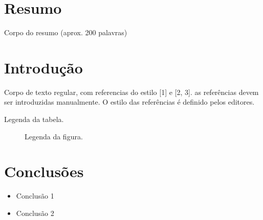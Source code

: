 \documentclass[11pt,twoside]{article}
\begin{document}
{\setlength{\parindent}{30pt}%

\small%
\section*{Resumo}
\smallskip
Corpo do resumo (aprox. 200 palavras)

\vspace{15pt}





\section{Introdução}
Corpo de texto regular, com referencias do estilo [1] e [2, 3]. as referências devem ser introduzidas manualmente. O estilo das referências é definido pelos editores.



\begin{table}[!h]
\caption{Legenda da tabela.}

\end{table}



\begin{figure}[!h]
\centering
\caption{Legenda da figura.}
\end{figure}








\section{Conclusões}

\begin{itemize}

\item Conclusão 1

\item Conclusão 2


\end{itemize}





}
\end{document}
